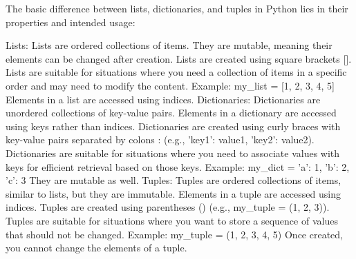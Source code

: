The basic difference between lists, dictionaries, and tuples in Python lies in their properties and intended usage:

Lists:
    Lists are ordered collections of items.
    They are mutable, meaning their elements can be changed after creation.
    Lists are created using square brackets [].
    Lists are suitable for situations where you need a collection of items in a specific order and may need to modify the content.
    Example: my_list = [1, 2, 3, 4, 5]
    Elements in a list are accessed using indices.
Dictionaries:
    Dictionaries are unordered collections of key-value pairs.
    Elements in a dictionary are accessed using keys rather than indices.
    Dictionaries are created using curly braces {} with key-value pairs separated by colons : (e.g., {'key1': value1, 'key2': value2}).
    Dictionaries are suitable for situations where you need to associate values with keys for efficient retrieval based on those keys.
    Example: my_dict = {'a': 1, 'b': 2, 'c': 3}
    They are mutable as well.
Tuples:
    Tuples are ordered collections of items, similar to lists, but they are immutable.
    Elements in a tuple are accessed using indices.
    Tuples are created using parentheses () (e.g., my_tuple = (1, 2, 3)).
    Tuples are suitable for situations where you want to store a sequence of values that should not be changed.
    Example: my_tuple = (1, 2, 3, 4, 5)
    Once created, you cannot change the elements of a tuple.